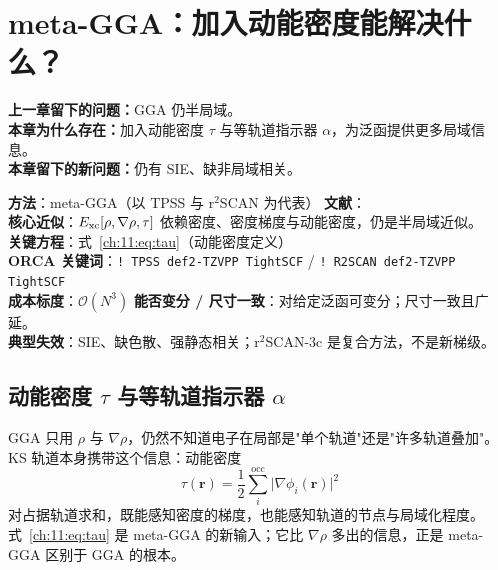 
\section{meta-GGA：加入动能密度能解决什么？}
\label{ch:11:sec:title}

\begin{problemchain}
\textbf{上一章留下的问题：}GGA 仍半局域。\\
\textbf{本章为什么存在：}加入动能密度 $\tau$ 与等轨道指示器 $\alpha$，为泛函提供更多局域信息。\\
\textbf{本章留下的新问题：}仍有 SIE、缺非局域相关。
\end{problemchain}

\begin{methodcard}
\textbf{方法}：meta-GGA（以 TPSS 与 r$^2$SCAN 为代表）\quad
\textbf{文献}：\citep{tao2003,sun2015scan,furness2020r2scan}\\
\textbf{核心近似}：$E_{\mathrm{xc}}[\rho,\nabla\rho,\tau]$ 依赖密度、密度梯度与动能密度，仍是半局域近似。\\
\textbf{关键方程}：式~\eqref{ch:11:eq:tau}（动能密度定义）\\
\textbf{ORCA 关键词}：\texttt{! TPSS def2-TZVPP TightSCF} / \texttt{! R2SCAN def2-TZVPP TightSCF}\\
\textbf{成本标度}：$\mathcal{O}(N^3)$\quad
\textbf{能否变分 / 尺寸一致}：对给定泛函可变分；尺寸一致且广延。\\
\textbf{典型失效}：SIE、缺色散、强静态相关；r$^2$SCAN-3c 是复合方法，不是新梯级。
\end{methodcard}

\subsection{动能密度 $\tau$ 与等轨道指示器 $\alpha$}
\label{ch:11:sec:tau}

GGA 只用 $\rho$ 与 $\nabla\rho$，仍然不知道电子在局部是"单个轨道"还是"许多轨道叠加"。KS 轨道本身携带这个信息：动能密度
\begin{equation}
\tau(\mathbf r)=\frac12\sum_i^{\mathrm{occ}}\big\lvert\nabla\phi_i(\mathbf r)\big\rvert^2
\label{ch:11:eq:tau}
\end{equation}
对占据轨道求和，既能感知密度的梯度，也能感知轨道的节点与局域化程度。式~\eqref{ch:11:eq:tau} 是 meta-GGA 的新输入；它比 $\nabla\rho$ 多出的信息，正是 meta-GGA 区别于 GGA 的根本。

